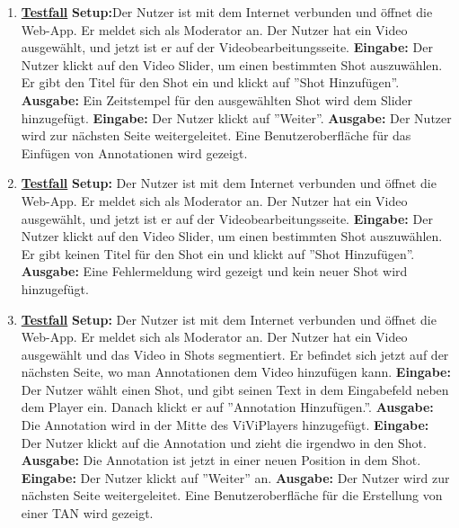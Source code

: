 \begin{enumerate}
	\item \underline{\textbf{Testfall}} \linebreak
	\textbf{Setup:}Der Nutzer ist mit dem Internet verbunden und öffnet die Web-App. Er meldet sich als Moderator an. Der Nutzer hat ein Video ausgewählt, und jetzt ist er auf der Videobearbeitungsseite.\linebreak
	\textbf{Eingabe:} Der Nutzer klickt auf den Video Slider, um einen bestimmten Shot auszuwählen. Er gibt den Titel für den Shot ein und klickt auf ''Shot Hinzufügen''. \linebreak
	\textbf{Ausgabe:} Ein Zeitstempel für den ausgewählten Shot wird dem Slider hinzugefügt.\linebreak
	\textbf{Eingabe:} Der Nutzer klickt auf ''Weiter''. \linebreak
	\textbf{Ausgabe:} Der Nutzer wird zur nächsten Seite weitergeleitet. Eine Benutzeroberfläche für das Einfügen von Annotationen wird gezeigt.
	
	\item \underline{\textbf{Testfall}} \linebreak
	\textbf{Setup:} Der Nutzer ist mit dem Internet verbunden und öffnet die Web-App. Er meldet sich als Moderator an. Der Nutzer hat ein Video ausgewählt, und jetzt ist er auf der Videobearbeitungsseite.\linebreak
	\textbf{Eingabe:} Der Nutzer klickt auf den Video Slider, um einen bestimmten Shot auszuwählen. Er gibt keinen Titel für den Shot ein und klickt auf ''Shot Hinzufügen''. \linebreak
	\textbf{Ausgabe:} Eine Fehlermeldung wird gezeigt und kein neuer Shot wird hinzugefügt.
	
	\item \underline{\textbf{Testfall}} \linebreak
	\textbf{Setup:} Der Nutzer ist mit dem Internet verbunden und öffnet die Web-App. Er meldet sich als Moderator an. Der Nutzer hat ein Video ausgewählt und das Video in Shots segmentiert. Er befindet sich jetzt auf der nächsten Seite, wo man Annotationen dem Video hinzufügen kann.\linebreak
	\textbf{Eingabe:} Der Nutzer wählt einen Shot, und gibt seinen Text in dem Eingabefeld neben dem Player ein. Danach klickt er auf ''Annotation Hinzufügen.''.\linebreak
	\textbf{Ausgabe:} Die Annotation wird in der Mitte des ViViPlayers hinzugefügt.\linebreak
	\textbf{Eingabe:} Der Nutzer klickt auf die Annotation und zieht die irgendwo in den Shot.\linebreak
	\textbf{Ausgabe:} Die Annotation ist jetzt in einer neuen Position in dem Shot.\linebreak
	\textbf{Eingabe:} Der Nutzer klickt auf ''Weiter'' an. \linebreak
	\textbf{Ausgabe:} Der Nutzer wird zur nächsten Seite weitergeleitet. Eine Benutzeroberfläche für die Erstellung von einer TAN wird gezeigt.
	

\end{enumerate}
